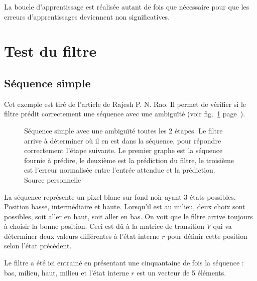 La boucle d'apprentissage est réalisée autant de fois que nécessaire pour que
les erreurs d'apprentissages deviennent non significatives.



\section{Test du filtre} %
\label{sec:Test du filtre}

\subsection{Séquence simple} %
\label{sub:Sequence simple}

Cet exemple est tiré de l'article de Rajesh P. N. Rao. Il permet de vérifier si
le filtre prédit correctement une séquence avec une ambiguïté (voir
fig.~\ref{fig:sequence_simple} page~\pageref{fig:sequence_simple}).

\begin{figure}[ht]
   \begin{center}
   \end{center}
   \caption[Prédiction de séquence simple]{Séquence simple avec une ambiguïté
   toutes les 2 étapes. Le filtre arrive à déterminer où il en est dans la
   séquence, pour répondre correctement l'étape suivante. Le premier graphe est
   la séquence fournie à prédire, le deuxième est la prédiction du filtre, le
   troisième est l'erreur normalisée entre l'entrée attendue et la prédiction.
   Source personnelle}
   \label{fig:sequence_simple}
\end{figure}

La séquence représente un pixel blanc sur fond noir ayant 3 états possibles.
Position basse, intermédiaire et haute. Lorsqu'il est au milieu, deux choix sont
possibles, soit aller en haut, soit aller en bas. On voit que le filtre arrive
toujours à choisir la bonne position. Ceci est dû à la matrice de transition
$V$ qui va déterminer deux valeurs différentes à l'état interne $r$ pour définir
cette position selon l'état précédent\cite{Rao1999}.

Le filtre a été ici entrainé en présentant une cinquantaine de fois la séquence :
bas, milieu, haut, milieu et l'état interne $r$ est un vecteur de 5 éléments.


